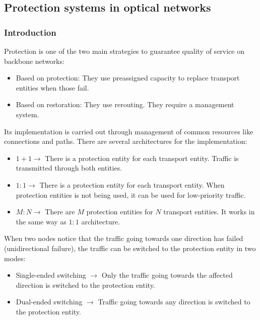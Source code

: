 \documentclass[../main.tex]{subfiles}
\begin{document}

\subsection{Protection systems in optical networks}

\subsubsection{Introduction}

Protection is one of the two main strategies to guarantee quality of service on backbone networks:
\begin{itemize}
	\item Based on protection: They use preassigned capacity to replace transport entities when those fail.
	\item Based on restoration: They use rerouting. They require a management system.
\end{itemize}

Its implementation is carried out through management of common resources like connections and paths. There are several architectures for the implementation:
\begin{itemize}
	\item $1+1 \rightarrow$ There is a protection entity for each transport entity. Traffic is transmitted through both entities.
	\item $1:1 \rightarrow$ There is a protection entity for each transport entity. When protection entities is not being used, it can be used for low-priority traffic.
	\item $M:N \rightarrow$ There are $M$ protection entities for $N$ transport entities. It works in the same way as $1:1$ architecture.
\end{itemize}

When two nodes notice that the traffic going towards one direction has failed (unidirectional failure), the traffic can be switched to the protection entity in two modes:
\begin{itemize}
	\item Single-ended switching $\rightarrow$ Only the traffic going towards the affected direction is switched to the protection entity.
	\item Dual-ended switching $\rightarrow$ Traffic going towards any direction is switched to the protection entity.
\end{itemize}
\end{document}
